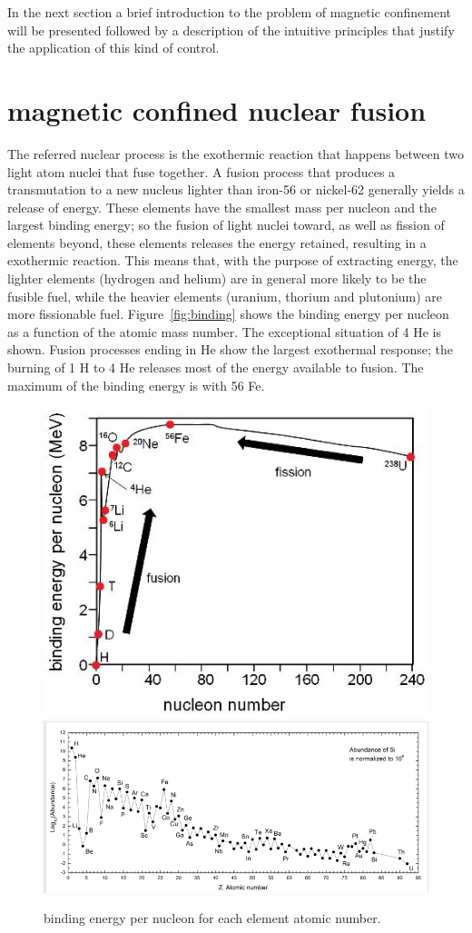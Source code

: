 In the next section a brief introduction to the problem of magnetic confinement will be presented followed by a description of the intuitive principles that justify the application of this kind of control.




\section{magnetic confined nuclear fusion}
The referred nuclear process is the exothermic reaction that happens between two light atom nuclei that fuse together. A fusion process that produces a transmutation to a new nucleus lighter than iron-56 or nickel-62 generally yields a release of energy. These elements have the smallest mass per nucleon and the largest binding energy; so the fusion of light nuclei toward, as well as fission of elements beyond, these elements releases the energy retained, resulting in a exothermic reaction.  This means that, with the purpose of extracting energy, the lighter elements (hydrogen and helium) are in general more likely to be the fusible fuel, while the heavier elements (uranium, thorium and plutonium) are more fissionable fuel. 
Figure~\ref{fig:binding} shows the binding energy per nucleon as a function of the atomic mass number. The exceptional situation of 4 He is shown. Fusion processes ending in He show the largest exothermal response; the burning of 1 H to 4 He releases most of the energy available to fusion. The maximum of the binding energy is with 56 Fe.

\begin{figure}[ht!]
\includegraphics[height=0.25\textwidth]{img/binding_energy.jpg} \centering
\includegraphics[height=0.25\textwidth]{img/abundance.png} \centering
\caption{binding energy per nucleon for each element atomic number. }
\label{binding}
\end{figure}

